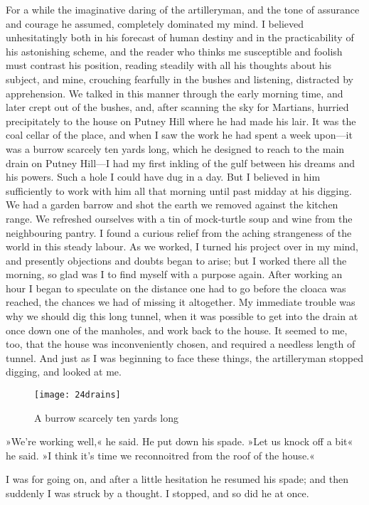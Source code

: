 For a while the imaginative daring of the artilleryman, and the tone of assurance and courage he assumed, completely dominated my mind. I believed unhesitatingly both in his forecast of human destiny and in the practicability of his astonishing scheme, and the reader who thinks me susceptible and foolish must contrast his position, reading steadily with all his thoughts about his subject, and mine, crouching fearfully in the bushes and listening, distracted by apprehension. We talked in this manner through the early morning time, and later crept out of the bushes, and, after scanning the sky for Martians, hurried precipitately to the house on Putney Hill where he had made his lair. It was the coal cellar of the place, and when I saw the work he had spent a week upon—it was a burrow scarcely ten yards long, which he designed to reach to the main drain on Putney Hill—I had my first inkling of the gulf between his dreams and his powers. Such a hole I could have dug in a day. But I believed in him sufficiently to work with him all that morning until past midday at his digging. We had a garden barrow and shot the earth we removed against the kitchen range. We refreshed ourselves with a tin of mock-turtle soup and wine from the neighbouring pantry. I found a curious relief from the aching strangeness of the world in this steady labour. As we worked, I turned his project over in my mind, and presently objections and doubts began to arise; but I worked there all the morning, so glad was I to find myself with a purpose again. After working an hour I began to speculate on the distance one had to go before the cloaca was reached, the chances we had of missing it altogether. My immediate trouble was why we should dig this long tunnel, when it was possible to get into the drain at once down one of the manholes, and work back to the house. It seemed to me, too, that the house was inconveniently chosen, and required a needless length of tunnel. And just as I was beginning to face these things, the artilleryman stopped digging, and looked at me.

\begin{figure}[tbp]
\centering
\texttt{[image: 24drains]}
\caption{A burrow scarcely ten yards long}
\end{figure}

»We're working well,« he said. He put down his spade. »Let us knock off a bit« he said. »I think it's time we reconnoitred from the roof of the house.«

I was for going on, and after a little hesitation he resumed his spade; and then suddenly I was struck by a thought. I stopped, and so did he at once.

